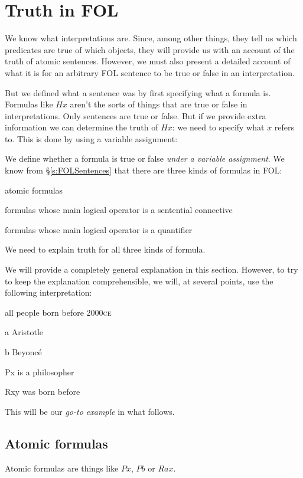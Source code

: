 \chapter{Truth in FOL}\label{s:TruthFOL}
We know what interpretations are. Since, among other things, they tell us which predicates are true of which objects, they will provide us with an account of the truth of atomic sentences. However, we must also present a detailed account of what it is for an arbitrary FOL sentence to be true or false in an interpretation. 

But we defined what a sentence was by first specifying what a formula is. Formulas like $Hx$ aren't the sorts of things that are true or false in interpretations. Only sentences are true or false. But if we provide extra information we can determine the truth of $Hx$: we need to specify what $x$ refers to. This is done by using a variable assignment: 

We define whether a formula is true or false \emph{under a variable assignment}.
We know from \S\ref{s:FOLSentences} that there are three kinds of formulas in FOL: 
	\begin{ebullet}
		\item atomic formulas
		\item formulas whose main logical operator is a sentential connective
		\item formulas whose main logical operator is a quantifier
	\end{ebullet}
We need to explain truth for all three kinds of formula.

We will provide a completely general explanation in this section. However, to try to keep the explanation comprehensible, we will, at several points, use the following interpretation:
	\begin{ekey}
		\item[\text{domain}] all people born before 2000\textsc{ce}
		\item[a] Aristotle
		\item[b] Beyonc\'e
		\item[Px]  is a philosopher
		\item[Rxy]  was born before 
	\end{ekey}
This will be our \emph{go-to example} in what follows.

\section{Atomic formulas}
Atomic formulas are things like $Px$, $Pb$ or $Rax$. 

